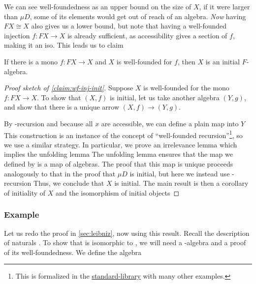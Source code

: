 We can see well-foundedness as an upper bound on the size of $X$, if it were larger than $\mu D$, some of its elements would get out of reach of an algebra. \textit{Now} having $FX \cong X$ also gives us a lower bound, but note that having a well-founded injection $f: FX \to X$ is already sufficient, as accessibility gives a section of $f$, making it an iso. This leads us to claim
\begin{claim}\label{claim:wf-inj-init}
    If there is a mono $f : FX \to X$ and $X$ is well-founded for $f$, then $X$ is an initial $F$-algebra.
\end{claim}
\begin{proof}[Proof sketch of \autoref{claim:wf-inj-init}]
Suppose $X$ is well-founded for the mono $f : FX \to X$. To show that $(X, f)$ is initial, let us take another algebra $(Y, g)$, and show that there is a unique arrow $(X, f) \to (Y, g)$.

By -recursion and because all $x$ are accessible, we can define a plain map into $Y$
This construction is an instance of the concept of ``well-founded recursion''\footnote{This is formalized in the \href{https://agda.github.io/agda-stdlib/Induction.WellFounded.html}{standard-library} with many other examples.}, so we use a similar strategy. In particular, we prove an irrelevance lemma
which implies the unfolding lemma
The unfolding lemma ensures that the map we defined by  is a map of algebras. The proof that this map is unique proceeds analogously to that in the proof that $\mu D$ is initial, but here we instead use -recursion
Thus, we conclude that $X$ is initial. The main result is then a corollary of initiality of $X$ and the isomorphism of initial objects
\end{proof}


\subsubsection{Example}
Let us redo the proof in \autoref{sec:leibniz}, now using this result. Recall the description of naturals . To show that  is isomorphic to , we will need a -algebra and a proof of its well-foundedness. We define the algebra


